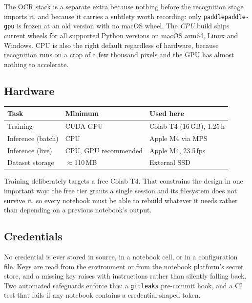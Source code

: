 \documentclass[11pt,a4paper]{article}
\begin{document}
The OCR stack is a separate extra because nothing before the recognition stage
imports it, and because it carries a subtlety worth recording: only
\texttt{paddlepaddle-gpu} is frozen at an old version with no macOS wheel. The
\emph{CPU} build ships current wheels for all supported Python versions on macOS
arm64, Linux and Windows. CPU is also the right default regardless of hardware,
because recognition runs on a crop of a few thousand pixels and the GPU has
almost nothing to accelerate.

\subsection{Hardware}

\begin{center}
\small
\begin{tabular}{@{}lll@{}}
\toprule
\textbf{Task} & \textbf{Minimum} & \textbf{Used here} \\
\midrule
Training & CUDA GPU & Colab T4 (16\,GB), 1.25\,h \\
Inference (batch) & CPU & Apple M4 via MPS \\
Inference (live) & CPU, GPU recommended & Apple M4, 23.5\,fps \\
Dataset storage & $\approx$110\,MB & External SSD \\
\bottomrule
\end{tabular}
\end{center}

Training deliberately targets a free Colab T4. That constrains the design in one
important way: the free tier grants a single session and its filesystem does not
survive it, so every notebook must be able to rebuild whatever it needs rather
than depending on a previous notebook's output.

\subsection{Credentials}

No credential is ever stored in source, in a notebook cell, or in a
configuration file. Keys are read from the environment or from the notebook
platform's secret store, and a missing key raises with instructions rather than
silently falling back. Two automated safeguards enforce this: a \texttt{gitleaks}
pre-commit hook, and a CI test that fails if any notebook contains a
credential-shaped token.

\newpage
\end{document}
